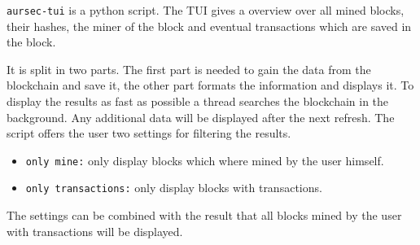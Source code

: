 \label{sec:tui} %
\texttt{aursec-tui} is a python script. The TUI gives a overview over all mined blocks, their hashes, the miner of the block and eventual transactions which are saved in the block.

It is split in two parts. The first part is needed to gain the data from the blockchain and save it, the other part formats the information and displays it. To display the results as fast as possible a thread searches the blockchain in the background. Any additional data will be displayed after the next refresh. The script offers the user two settings for filtering the results.
\begin{itemize}
	\item \texttt{only mine:} only display blocks which where mined by the user himself.
	\item \texttt{only transactions:} only display blocks with transactions.
\end{itemize}
The settings can be combined with the result that all blocks mined by the user with transactions will be displayed.